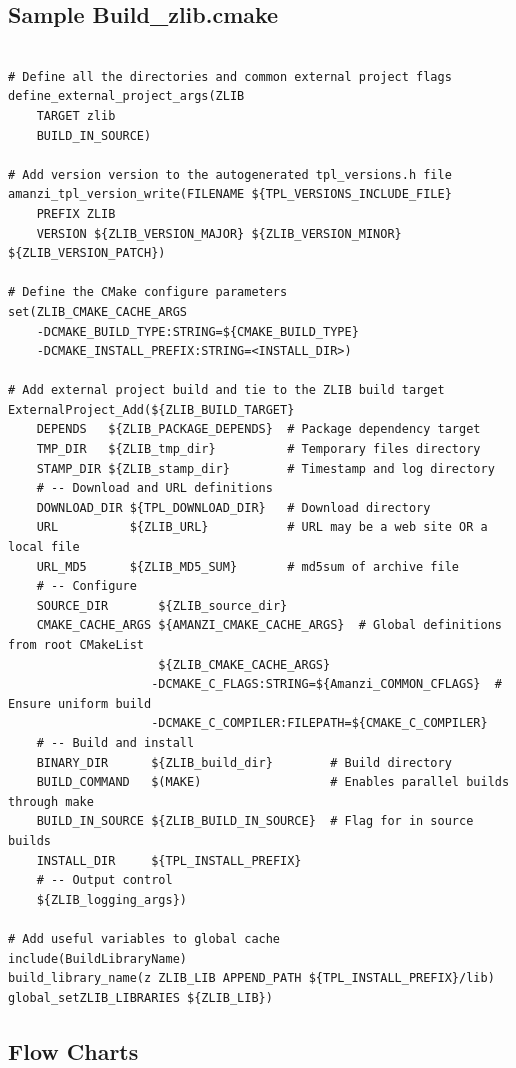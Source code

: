 \documentclass[12pt]{article}
\begin{document}
\subsection{Sample Build\_zlib.cmake}
\begin{verbatim}

# Define all the directories and common external project flags
define_external_project_args(ZLIB
    TARGET zlib
    BUILD_IN_SOURCE)

# Add version version to the autogenerated tpl_versions.h file
amanzi_tpl_version_write(FILENAME ${TPL_VERSIONS_INCLUDE_FILE}
    PREFIX ZLIB
    VERSION ${ZLIB_VERSION_MAJOR} ${ZLIB_VERSION_MINOR} ${ZLIB_VERSION_PATCH})
  
# Define the CMake configure parameters
set(ZLIB_CMAKE_CACHE_ARGS
    -DCMAKE_BUILD_TYPE:STRING=${CMAKE_BUILD_TYPE}
    -DCMAKE_INSTALL_PREFIX:STRING=<INSTALL_DIR>)

# Add external project build and tie to the ZLIB build target
ExternalProject_Add(${ZLIB_BUILD_TARGET}
    DEPENDS   ${ZLIB_PACKAGE_DEPENDS}  # Package dependency target
    TMP_DIR   ${ZLIB_tmp_dir}          # Temporary files directory
    STAMP_DIR ${ZLIB_stamp_dir}        # Timestamp and log directory
    # -- Download and URL definitions
    DOWNLOAD_DIR ${TPL_DOWNLOAD_DIR}   # Download directory
    URL          ${ZLIB_URL}           # URL may be a web site OR a local file
    URL_MD5      ${ZLIB_MD5_SUM}       # md5sum of archive file
    # -- Configure
    SOURCE_DIR       ${ZLIB_source_dir}
    CMAKE_CACHE_ARGS ${AMANZI_CMAKE_CACHE_ARGS}  # Global definitions from root CMakeList
                     ${ZLIB_CMAKE_CACHE_ARGS}
                    -DCMAKE_C_FLAGS:STRING=${Amanzi_COMMON_CFLAGS}  # Ensure uniform build
                    -DCMAKE_C_COMPILER:FILEPATH=${CMAKE_C_COMPILER}
    # -- Build and install
    BINARY_DIR      ${ZLIB_build_dir}        # Build directory 
    BUILD_COMMAND   $(MAKE)                  # Enables parallel builds through make
    BUILD_IN_SOURCE ${ZLIB_BUILD_IN_SOURCE}  # Flag for in source builds
    INSTALL_DIR     ${TPL_INSTALL_PREFIX}    
    # -- Output control
    ${ZLIB_logging_args})

# Add useful variables to global cache
include(BuildLibraryName)
build_library_name(z ZLIB_LIB APPEND_PATH ${TPL_INSTALL_PREFIX}/lib)
global_setZLIB_LIBRARIES ${ZLIB_LIB})
\end{verbatim}

\subsection{Flow Charts}
\end{document}
